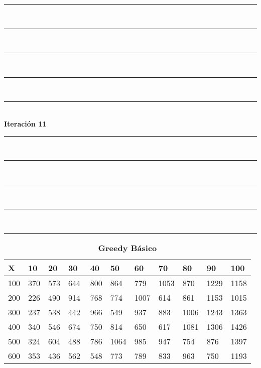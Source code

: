 \documentclass[10pt,letterpaper]{article}
\begin{document}
\newpage 
\begin{center}
\newcommand{\HRule}{\rule{\linewidth}{0.5mm}}
\center
\HRule\\[6cm]
\HRule\\[0.4cm]
\HRule\\[0.4cm]
\HRule\\[0.4cm]
\HRule\\[0.4cm]
{\centering \Huge\bfseries Iteración 11}\\[0.4cm]
\HRule\\[0.4cm]
\HRule\\[0.4cm]
\HRule\\[0.4cm]
\HRule\\[6cm]
\HRule
\end{center}
\newpage 
{}
\begin{center}
\begin{table}\renewcommand{\arraystretch}{2.5}
\caption{\large \textbf{Greedy Básico}}
\centering
\begin{tabular} { |m{0.5cm}|m{1.3cm}|m{1.3cm}|m{1.3cm}|m{1.3cm}|m{1.3cm}|m{1.3cm}|m{1.3cm}|m{1.3cm}|m{1.3cm}|m{1.3cm}|} 
\hline
\rowcolor{Gray}
\centering \textbf{X} & \centering \textbf{10} & \centering \textbf{20} & \centering \textbf{30}\ & \centering \textbf{40} & \centering \textbf{50} & \centering \textbf{60}\ & \centering \textbf{70} & \centering \textbf{80} & \centering \textbf{90}\ & \textbf{100} \\\hline
\cellcolor{Gray}100 & \Large 370 & \Large 573 & \Large 644 & \Large 800 & \Large 864 & \Large 779 & \Large 1053 & \Large 870 & \Large 1229 & \Large 1158 \\
\hline
\cellcolor{Gray}200 & \Large 226 & \Large 490 & \Large 914 & \Large 768 & \Large 774 & \Large 1007 & \Large 614 & \Large 861 & \Large 1153 & \Large 1015 \\
\hline
\cellcolor{Gray}300 & \Large 237 & \Large 538 & \Large 442 & \Large 966 & \Large 549 & \Large 937 & \Large 883 & \Large 1006 & \Large 1243 & \Large 1363 \\
\hline
\cellcolor{Gray}400 & \Large 340 & \Large 546 & \Large 674 & \Large 750 & \Large 814 & \Large 650 & \Large 617 & \Large 1081 & \Large 1306 & \Large 1426 \\
\hline
\cellcolor{Gray}500 & \Large 324 & \Large 604 & \Large 488 & \Large 786 & \Large 1064 & \Large 985 & \Large 947 & \Large 754 & \Large 876 & \Large 1397 \\
\hline
\cellcolor{Gray}600 & \Large 353 & \Large 436 & \Large 562 & \Large 548 & \Large 773 & \Large 789 & \Large 833 & \Large 963 & \Large 750 & \Large 1193 \\

\end{tabular}
\end{table}
\end{center}
\end{document}
